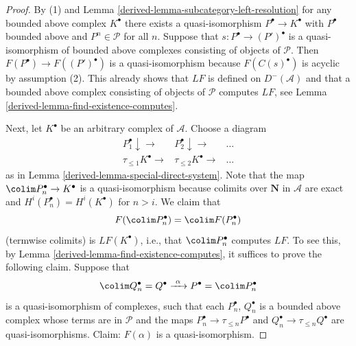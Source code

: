 \begin{proof}

By (1) and Lemma \ref{derived-lemma-subcategory-left-resolution} for any bounded
above complex $K^\bullet$ there exists a quasi-isomorphism
$P^\bullet \to K^\bullet$ with $P^\bullet$ bounded above and
$P^n \in \mathcal{P}$ for all $n$. Suppose that
$s : P^\bullet \to (P')^\bullet$ is a quasi-isomorphism of bounded
above complexes consisting of objects of $\mathcal{P}$. Then
$F(P^\bullet) \to F((P')^\bullet)$ is a quasi-isomorphism because
$F(C(s)^\bullet)$ is acyclic by assumption (2). This already shows that
$LF$ is defined on $D^{-}(\mathcal{A})$ and that a bounded above
complex consisting of objects of $\mathcal{P}$ computes $LF$, see
Lemma \ref{derived-lemma-find-existence-computes}.

\medskip\noindent
Next, let $K^\bullet$ be an arbitrary complex of $\mathcal{A}$.
Choose a diagram
$$
\begin{array}{ccc}P_1^\bullet \downarrow\longrightarrow & P_2^\bullet \downarrow\longrightarrow & \ldots \\ \tau_{\leq 1}K^\bullet \longrightarrow & \tau_{\leq 2}K^\bullet \longrightarrow & \ldots\end{array}
$$
as in Lemma \ref{derived-lemma-special-direct-system}. Note that
the map $\colim P_n^\bullet \to K^\bullet$ is a quasi-isomorphism
because colimits over $\mathbf{N}$ in $\mathcal{A}$ are exact
and $H^i(P_n^\bullet) = H^i(K^\bullet)$ for $n > i$. We claim that
$$
F(\colim P_n^\bullet) = \colim F(P_n^\bullet)
$$
(termwise colimits) is $LF(K^\bullet)$, i.e., that $\colim P_n^\bullet$
computes $LF$. To see this, by Lemma \ref{derived-lemma-find-existence-computes},
it suffices to prove the following claim. Suppose that
$$
\colim Q_n^\bullet = Q^\bullet
\xrightarrow{\ \alpha\ }
P^\bullet = \colim P_n^\bullet
$$
is a quasi-isomorphism of complexes, such that each
$P_n^\bullet$, $Q_n^\bullet$ is a bounded above complex whose terms are
in $\mathcal{P}$ and the maps $P_n^\bullet \to \tau_{\leq n}P^\bullet$ and
$Q_n^\bullet \to \tau_{\leq n}Q^\bullet$ are quasi-isomorphisms.
Claim: $F(\alpha)$ is a quasi-isomorphism.


\end{proof}
